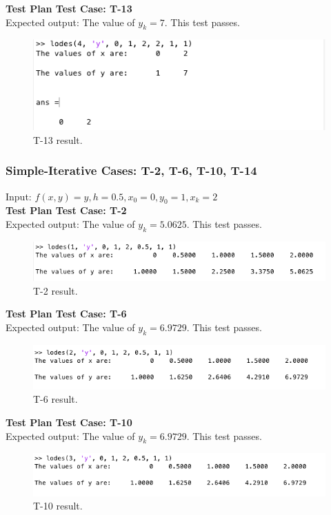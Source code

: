 \documentclass[12pt, titlepage]{article}
\begin{document}
\textbf{Test Plan Test Case: T-13}\\
Expected output: The value of $y_k = 7$. This test passes.\\
\begin{figure}[H]
 \includegraphics[width=\linewidth]{images/T13}
  \caption{T-13 result.}
  \label{fig:T13}
\end{figure}

\subsubsection{Simple-Iterative Cases: T-2, T-6, T-10, T-14}
Input: $f(x,y) = y, h = 0.5, x_0 = 0,y_0 = 1,x_k = 2$\\

\textbf{Test Plan Test Case: T-2}\\
Expected output: The value of $y_k = 5.0625$. This test passes.\\
\begin{figure}[H]
 \includegraphics[width=\linewidth]{images/T2}
  \caption{T-2 result.}
  \label{fig:T2}
\end{figure}

\textbf{Test Plan Test Case: T-6}\\
Expected output: The value of $y_k = 6.9729$. This test passes.\\
\begin{figure}[H]
 \includegraphics[width=\linewidth]{images/T6}
  \caption{T-6 result.}
  \label{fig:T6}
\end{figure}

\textbf{Test Plan Test Case: T-10}\\
Expected output: The value of $y_k = 6.9729$. This test passes.\\
\begin{figure}[H]
 \includegraphics[width=\linewidth]{images/T10}
  \caption{T-10 result.}
  \label{fig:T10}
\end{figure}
\end{document}
